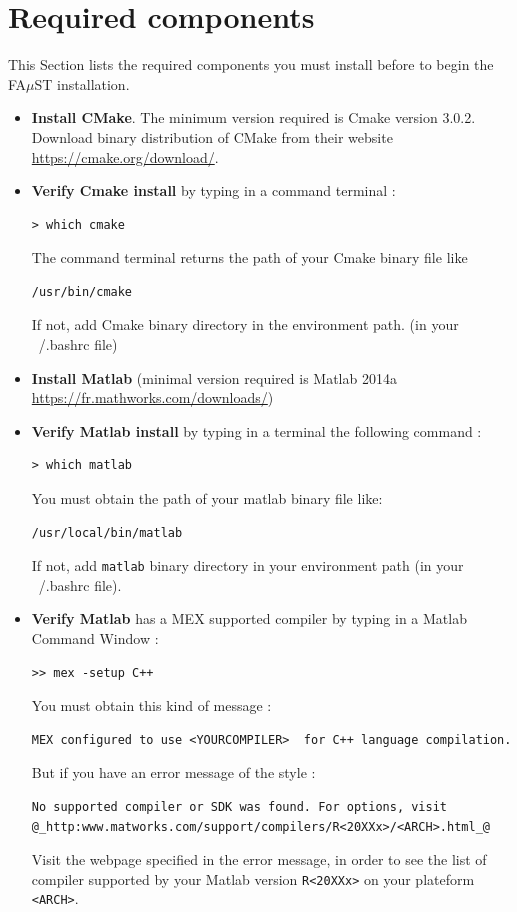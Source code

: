 \section{Required components}\label{sec:RequiredTools}
This Section lists the required components you must install before to begin the FA$\mu$ST installation. 
\begin{itemize}
\item \textbf{Install CMake}. The minimum version required is Cmake version 3.0.2. Download binary distribution of CMake from their website \url{https://cmake.org/download/}.


\item \textbf{Verify Cmake install} by typing in a command terminal : 
\lstset{style=customBash}
\begin{lstlisting}
> which cmake
\end{lstlisting}
The command terminal returns the path of your Cmake binary file like

\begin{lstlisting}
/usr/bin/cmake
\end{lstlisting}
If not, add Cmake binary directory in the environment path. (in your ~/.bashrc file)

\item \textbf{Install Matlab} (minimal version required is Matlab 2014a \url{https://fr.mathworks.com/downloads/})

\item \textbf{Verify Matlab install} by typing in a terminal the following command : 
\begin{lstlisting}
> which matlab
\end{lstlisting}
You must obtain the path of your matlab binary file like: 
\begin{lstlisting}
/usr/local/bin/matlab
\end{lstlisting}
If not, add \texttt{matlab} binary directory in your environment path (in your ~/.bashrc file). 
\item \textbf{Verify Matlab} has a MEX supported compiler by typing in a Matlab Command Window :
\lstset{style=customMatlab}
\begin{lstlisting}
>> mex -setup C++
\end{lstlisting}

You must obtain this kind of message :
\begin{lstlisting}
MEX configured to use <YOURCOMPILER>  for C++ language compilation.
\end{lstlisting}

But if you have an error message of the style :
\begin{lstlisting}[moredelim={**[is][\color{blue}]{@}{@}},moredelim={[is][\underbar]{_}{_}}]
No supported compiler or SDK was found. For options, visit 
@_http:www.matworks.com/support/compilers/R<20XXx>/<ARCH>.html_@
\end{lstlisting}
Visit the webpage specified in the error message,
in order to see the list of compiler supported by your Matlab version \texttt{R<20XXx>} on your plateform \texttt{<ARCH>}.

\end{itemize}


